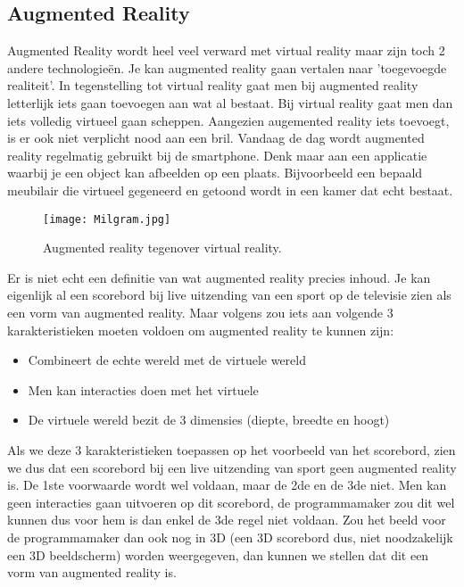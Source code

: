 \subsection{Augmented Reality}
\label{subsec:augmented-reality}
Augmented Reality wordt heel veel verward met virtual reality maar zijn toch 2 andere technologieën. Je kan augmented reality gaan vertalen naar 'toegevoegde realiteit'. In tegenstelling tot virtual reality gaat men bij augmented reality letterlijk iets gaan toevoegen aan wat al bestaat. Bij virtual reality gaat men dan iets volledig virtueel gaan scheppen. Aangezien augemented reality iets toevoegt, is er ook niet verplicht nood aan een bril. Vandaag de dag wordt augmented reality regelmatig gebruikt bij de smartphone. Denk maar aan een applicatie waarbij je een object kan afbeelden op een plaats. Bijvoorbeeld een bepaald meubilair die virtueel gegeneerd en getoond wordt in een kamer dat echt bestaat.

\begin{figure}
	\centering
	\texttt{[image: Milgram.jpg]}
	\caption{Augmented reality tegenover virtual reality.}
	\label{fig:ar-vs-vr}
\end{figure}

Er is niet echt een definitie van wat augmented reality precies inhoud. Je kan eigenlijk al een scorebord bij live uitzending van een sport op de televisie zien als een vorm van augmented reality. Maar volgens \autocite{Azuma1997} zou iets aan volgende 3 karakteristieken moeten voldoen om augmented reality te kunnen zijn:

\begin{itemize}
	\item Combineert de echte wereld met de virtuele wereld
	\item Men kan interacties doen met het virtuele
	\item De virtuele wereld bezit de 3 dimensies (diepte, breedte en hoogt)
\end{itemize}

Als we deze 3 karakteristieken toepassen op het voorbeeld van het scorebord, zien we dus dat een scorebord bij een live uitzending van sport geen augmented reality is. De 1ste voorwaarde wordt wel voldaan, maar de 2de en de 3de niet. Men kan geen interacties gaan uitvoeren op dit scorebord, de programmamaker zou dit wel kunnen dus voor hem is dan enkel de 3de regel niet voldaan. Zou het beeld voor de programmamaker dan ook nog in 3D (een 3D scorebord dus, niet noodzakelijk een 3D beeldscherm) worden weergegeven, dan kunnen we stellen dat dit een vorm van augmented reality is.


